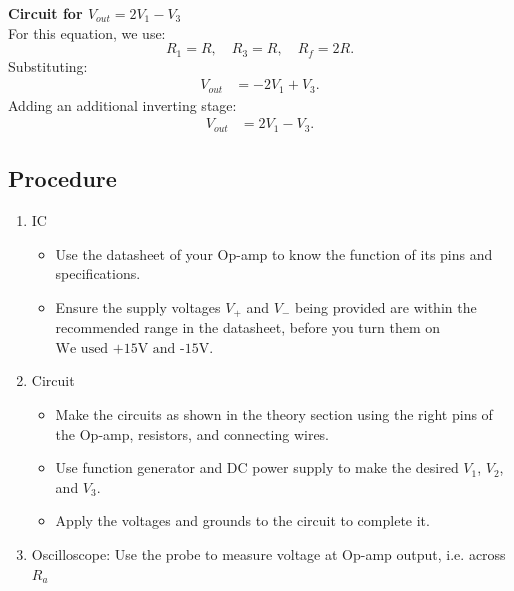 \documentclass[a4paper,12pt]{article}
\begin{document}
\textbf{Circuit for \( V_{out} = 2V_1 - V_3 \)}\\
For this equation, we use:
\begin{equation}
    R_1 = R, \quad R_3 = R, \quad R_f = 2R.
\end{equation}
Substituting:
\begin{align*}
    V_{out} &= -2V_1 + V_3.
\end{align*}
Adding an additional inverting stage:
\begin{align*}
    V_{out} &= 2V_1 - V_3.
\end{align*}
\begin{figure}[H]
\centering
{}%

\label{fig:my_label}
\end{figure}
\subsection{Procedure}
\begin{enumerate}
	\item IC
		\begin{itemize}
			\item Use the datasheet of your Op-amp to know the function of its pins and specifications.
			\item Ensure the supply voltages $V_+$ and $V_-$ being provided are within the recommended range in the datasheet, before you turn them on\(\text{We used +15V and -15V}\).
		\end{itemize}
	\item Circuit
		\begin{itemize}
			\item Make the circuits as shown in the theory section using the right pins of the Op-amp, resistors, and connecting wires.
			\item Use function generator and DC power supply to make the desired $V_1$, $V_2$, and $V_3$.
			\item Apply the voltages and grounds to the circuit to complete it.
		\end{itemize}
	\item Oscilloscope: Use the probe to measure voltage at Op-amp output, i.e. across $R_a$
\end{enumerate}
\end{document}
